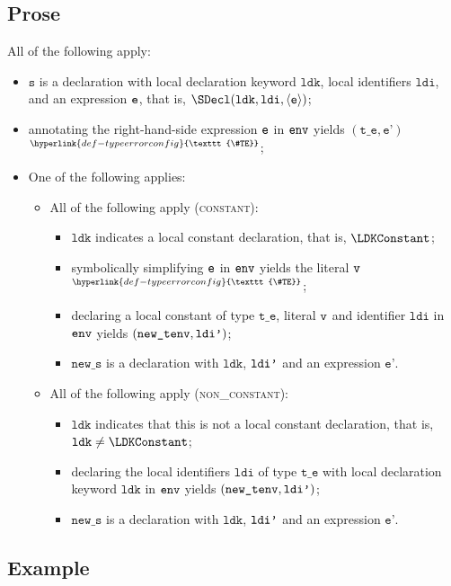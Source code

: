 \documentclass{book}
\newcommand\TypeErrorConfig[0]{\hyperlink{def-typeerrorconfig}{\texttt{\#TE}}}
\newcommand\ProseOrTypeError[0]{\hyperlink{def-proseortypeerror}{$^{\TypeErrorConfig}$}}
\newcommand\newtenv[0]{\texttt{new\_tenv}}
\newcommand\vte[0]{\texttt{t\_e}}
\newcommand\vs[0]{\texttt{s}}
\newcommand\ldi[0]{\texttt{ldi}}
\newcommand\ldk[0]{\texttt{ldk}}
\newcommand\news[0]{\texttt{new\_s}}
\newcommand\vep[0]{\texttt{e'}}
\begin{document}
\subsection{Prose}
All of the following apply:
\begin{itemize}
  \item $\vs$ is a declaration with local declaration keyword $\ldk$, local identifiers $\ldi$, and an expression $\texttt{e}$,
        that is, $\SDecl(\ldk, \ldi, \langle\ve\rangle)$;
  \item annotating the right-hand-side expression $\texttt{e}$ in $\texttt{env}$ yields $(\vte,\vep)$ \ProseOrTypeError;
  \item One of the following applies:
  \begin{itemize}
    \item All of the following apply (\textsc{constant}):
    \begin{itemize}
      \item $\ldk$ indicates a local constant declaration, that is, $\LDKConstant$;
      \item symbolically simplifying $\texttt{e}$ in $\texttt{env}$ yields the literal $\texttt{v}$ \ProseOrTypeError;
      \item declaring a local constant of type $\vte$, literal $\texttt{v}$ and identifier $\ldi$ in $\texttt{env}$ yields $(\newtenv, \ldip)$;
      \item $\news$ is a declaration with $\ldk$, $\texttt{ldi'}$ and an expression $\vep$.
    \end{itemize}

    \item All of the following apply (\textsc{non\_constant}):
    \begin{itemize}
      \item $\ldk$ indicates that this is not a local constant declaration, that is, $\ldk\neq\LDKConstant$;
      \item declaring the local identifiers $\ldi$ of type $\vte$ with local declaration keyword $\ldk$ in $\texttt{env}$
            yields $(\newtenv, \ldip)$;
      \item $\news$ is a declaration with $\ldk$, $\texttt{ldi'}$ and an expression $\vep$.
    \end{itemize}
  \end{itemize}
\end{itemize}

\subsection{Example}
\end{document}

